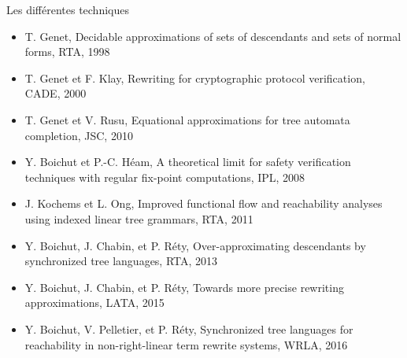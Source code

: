 \documentclass[xcolor={dvipsnames}]{beamer}
\begin{document}
\begin{frame}{Les différentes techniques}
  \vspace{\baselineskip}
  \begin{overprint}
    \begin{itemize}
    \item {\footnotesize T. Genet, Decidable approximations of sets of descendants and sets of normal forms, RTA, 1998}
    \item {\footnotesize T. Genet et F. Klay, Rewriting for cryptographic protocol verification, CADE, 2000}
    \item {\footnotesize T. Genet et V. Rusu, Equational approximations for tree automata completion, JSC, 2010}
    \end{itemize}
    \begin{itemize}
    \item {\footnotesize Y. Boichut et P.-C. Héam, A theoretical limit for safety verification techniques with regular fix-point computations, IPL, 2008}
    \end{itemize}
    \begin{itemize}
    \item {\footnotesize J. Kochems et L. Ong, Improved functional flow and reachability analyses using indexed linear tree grammars, RTA, 2011}
    \end{itemize}
    \begin{itemize}
    \item {\footnotesize Y. Boichut, J. Chabin, et P. Réty, Over-approximating descendants by synchronized tree languages, RTA, 2013}
    \end{itemize}
    \begin{itemize}
    \item {\footnotesize Y. Boichut, J. Chabin, et P. Réty, Towards more precise rewriting approximations, LATA, 2015}
    \end{itemize}
    \begin{itemize}
    \item {\footnotesize Y. Boichut, V. Pelletier, et P. Réty, Synchronized tree languages for reachability in non-right-linear term rewrite systems, WRLA, 2016}
    \end{itemize}
  \end{overprint}
\end{frame}
\end{document}
